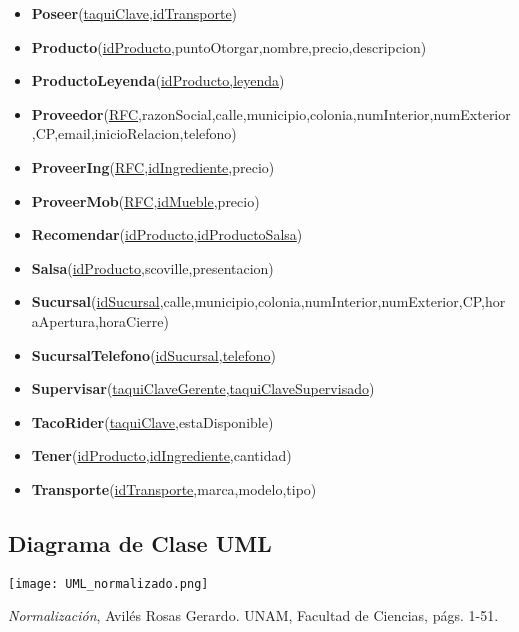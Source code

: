\documentclass[11pt,letterpaper]{article}
\begin{document}
\begin{itemize}
\item \footnotesize{\textbf{Poseer}(\underline{taquiClave},\underline{idTransporte})}
\item \footnotesize{\textbf{Producto}(\underline{idProducto},puntoOtorgar,nombre,precio,descripcion)}
\item \footnotesize{\textbf{ProductoLeyenda}(\underline{idProducto,leyenda})}
\item \scriptsize{\textbf{Proveedor}(\underline{RFC},razonSocial,calle,municipio,colonia,numInterior,numExterior,CP,email,inicioRelacion,telefono)}
\item \footnotesize{\textbf{ProveerIng}(\underline{RFC},\underline{idIngrediente},precio)}
\item \footnotesize{\textbf{ProveerMob}(\underline{RFC},\underline{idMueble},precio)}
\item \footnotesize{\textbf{Recomendar}(\underline{idProducto},\underline{idProductoSalsa})}
\item \footnotesize{\textbf{Salsa}(\underline{idProducto},scoville,presentacion)}
\item {\footnotesize \textbf{Sucursal}(\underline{idSucursal},calle,municipio,colonia,numInterior,numExterior,CP,horaApertura,horaCierre)}
\item \footnotesize{\textbf{SucursalTelefono}(\underline{idSucursal},\underline{telefono})}
\item \footnotesize{\textbf{Supervisar}(\underline{taquiClaveGerente},\underline{taquiClaveSupervisado})}
\item \footnotesize{\textbf{TacoRider}(\underline{taquiClave},estaDisponible)}
\item \footnotesize{\textbf{Tener}(\underline{idProducto},\underline{idIngrediente},cantidad)}
\item \footnotesize{\textbf{Transporte}(\underline{idTransporte},marca,modelo,tipo)}

\end{itemize}
\subsection{Diagrama de Clase UML}

 \begin{landscape}
\begin{center}
\begin{minipage}{1\linewidth}
\texttt{[image: UML\_normalizado.png]}
\end{minipage}
\end{center}
\end{landscape}





\newpage 
 \begin{thebibliography}{1}


     \textit{Normalización}, Avilés Rosas Gerardo. UNAM, Facultad de Ciencias, págs. 1-51.


  \end{thebibliography}
\end{document}
